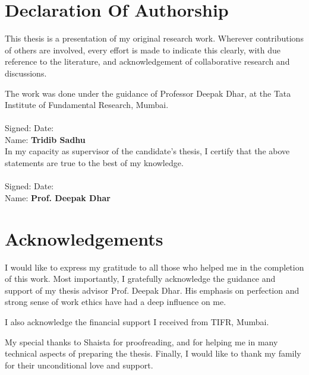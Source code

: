 \documentclass[11pt,a4paper]{book}
\begin{document}
\chapter*{Declaration Of Authorship}
This thesis is a presentation of my original research work. Wherever
contributions of others are involved, every effort is made to indicate
this clearly, with due reference to the literature, and
acknowledgement of collaborative research and discussions.

The work was done under the guidance of Professor Deepak Dhar, at the
Tata Institute of Fundamental Research, Mumbai.\\
\vspace{0.5in}\\
Signed: \dotfill \hspace{2.0cm}  Date:\dotfill\\
\vspace{0.02in}
Name: {\Large \textbf{Tridib Sadhu}}
\newline
\vspace{1.0in}\\
In my capacity as supervisor of the candidate's thesis, I certify that
the above statements are true to the best of my knowledge.\\
\vspace{0.5in}\\
Signed: \dotfill \hspace{2.0cm}  Date:\dotfill\\
\vspace{0.02in}
Name: {\Large \textbf{Prof. Deepak Dhar}}
\noindent

\chapter*{Acknowledgements}
I would like to express my gratitude to all those who helped me in the
completion of this work. Most importantly, I gratefully acknowledge
the guidance and support of my thesis advisor Prof. Deepak Dhar. His
emphasis on perfection and strong sense of work ethics have had a deep
influence on me.

I also acknowledge the financial support I received from TIFR, Mumbai.

My special thanks to Shaista for proofreading, and for helping
me in many technical aspects of preparing the thesis. Finally, I
would like to thank my family for their unconditional love and support.
\end{document}
